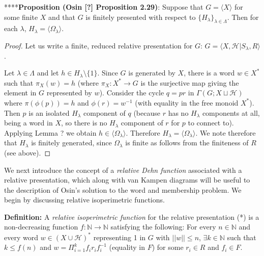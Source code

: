 \documentclass[12pt]{article}
\newcommand{\vs}{\vskip10pt}
\begin{document}
	****\textbf{Proposition (Osin [?] Proposition 2.29)}: Suppose that $G = \langle X \rangle$ for some finite $X$ and that $G$ is finitely presented with respect to $\{H_{\lambda}\}_{\lambda \in \Lambda}$. Then for each $\lambda$, $H_{\lambda} = \langle \Omega_{\lambda} \rangle$. 
	
	\begin{proof}
		
		Let us write a finite, reduced relative presentation for $G$: $G = \langle X, \mathcal{H} \vert S_{\lambda}, R \rangle$. 
		
		\vs 
		
		Let $\lambda \in \Lambda$ and let $h \in H_{\lambda} \setminus \{1\}$. Since $G$ is generated by $X$, there is a word $w \in X^*$ such that $\pi_X(w) = h$ (where $\pi_X: X^* \rightarrow G$ is the surjective map giving the element in $G$ represented by $w$). Consider the cycle $q = pr$ in $\Gamma(G; X \sqcup \mathcal{H})$ where $\pi(\phi(p)) = h$ and $\phi(r) = w^{-1}$ (with equality in the free monoid $X^*$). Then $p$ is an isolated $H_{\lambda}$ component of $q$ (because $r$ has no $H_{\lambda}$ components at all, being a word in $X$, so there is no $H_{\lambda}$ component of $r$ for $p$ to connect to). Applying Lemma ? we obtain $h \in \langle \Omega_{\lambda} \rangle$. Therefore $H_{\lambda} = \langle \Omega_{\lambda} \rangle$. We note therefore that $H_{\lambda}$ is finitely generated, since $\Omega_{\lambda}$ is finite as follows from the finiteness of $R$ (see above). 
		
	\end{proof}

	We next introduce the concept of a \textit{relative Dehn function} associated with a relative presentation, which along with van Kampen diagrams will be useful to the description of Osin's solution to the word and membership problem. We begin by discussing relative isoperimetric functions. 
	
	\vs 
	
	\textbf{Definition: } A \textit{relative isoperimetric function} for the relative presentation (*) is a non-decreasing function $f: \mathbb{N} \rightarrow \mathbb{N}$ satisfying the following: For every $n \in \mathbb{N}$ and every word $w \in (X \cup \mathcal{H})^*$ representing 1 in $G$ with $\vert \vert w \vert \vert \leq n$, $\exists k \in \mathbb{N}$ such that $k \leq f(n)$ and $w = \Pi_{i=1}^k f_i r_i f_i^{-1}$ (equality in $F$) for some $r_i \in R$ and $f_i \in F$. 
	
	\vs 
	
\end{document}
